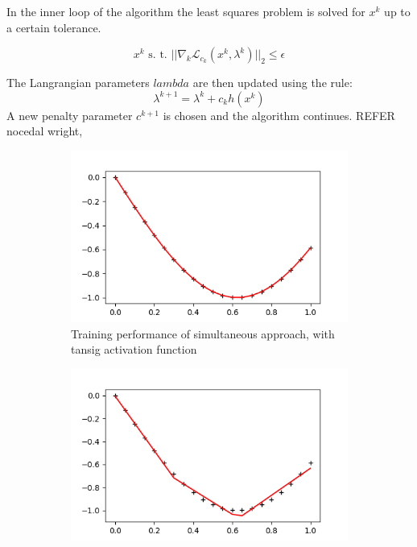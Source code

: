 In the inner loop of the algorithm the least squares problem is solved for $x^k$ up to a certain tolerance.

\begin{equation}
x^k \text{ s. t. } ||\nabla_k\mathcal{L}_{c_k}(x^k,\lambda^k)||_2 \leq \epsilon
\end{equation}

The Langrangian parameters $lambda$ are then updated using the rule:
\begin{equation}
\lambda^{k+1} = \lambda^k + c_kh(x^k)
\end{equation}
A new penalty parameter $c^{k+1}$ is chosen and the algorithm continues. REFER nocedal wright,

\begin{figure}
     \centering
     \begin{subfigure}[b]{0.8\textwidth}
         \centering
         \includegraphics[width=\textwidth]{alm-tanh}
         \caption{Training performance of simultaneous approach, with tansig activation function}
         \label{alm-tanh}
     \end{subfigure}
     \begin{subfigure}[b]{0.8\textwidth}
         \centering
         \includegraphics[width=\textwidth]{alm-relu}

\end{subfigure}
\end{figure}
